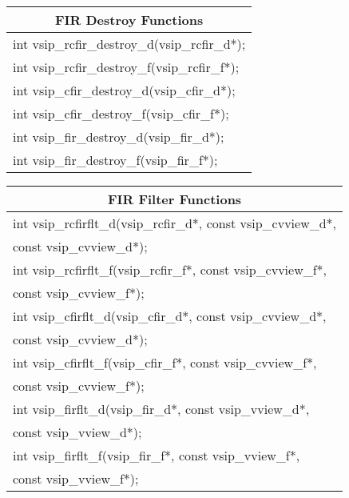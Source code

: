 \newline \hspace*{1.cm} {
\ttfamily
\begin{tabular}[H]{|l|}
\multicolumn{1}{c}{\rmfamily \bfseries FIR Destroy Functions\vspace{.1cm}}\\ \hline
int vsip\_rcfir\_destroy\_d(vsip\_rcfir\_d*);\\
int vsip\_rcfir\_destroy\_f(vsip\_rcfir\_f*);\\
int vsip\_cfir\_destroy\_d(vsip\_cfir\_d*);\\
int vsip\_cfir\_destroy\_f(vsip\_cfir\_f*);\\
int vsip\_fir\_destroy\_d(vsip\_fir\_d*);\\
int vsip\_fir\_destroy\_f(vsip\_fir\_f*);\\\hline
\end{tabular}\vspace{.1cm}
}\vspace{.1cm}
\newline \hspace*{1.cm} {
\ttfamily
\begin{tabular}[H]{|l|}
\multicolumn{1}{c}{\rmfamily \bfseries FIR Filter Functions\vspace{.1cm}}\\ \hline
int vsip\_rcfirflt\_d(vsip\_rcfir\_d*, const vsip\_cvview\_d*,\\*\hspace{.7cm}const vsip\_cvview\_d*);\\
int vsip\_rcfirflt\_f(vsip\_rcfir\_f*, const vsip\_cvview\_f*,\\*\hspace{.7cm}const vsip\_cvview\_f*);\\
int vsip\_cfirflt\_d(vsip\_cfir\_d*, const vsip\_cvview\_d*,\\*\hspace{.7cm}const vsip\_cvview\_d*);\\
int vsip\_cfirflt\_f(vsip\_cfir\_f*, const vsip\_cvview\_f*,\\*\hspace{.7cm}const vsip\_cvview\_f*);\\
int vsip\_firflt\_d(vsip\_fir\_d*, const vsip\_vview\_d*,\\*\hspace{.7cm}const vsip\_vview\_d*);\\
int vsip\_firflt\_f(vsip\_fir\_f*, const vsip\_vview\_f*,\\*\hspace{.7cm}const vsip\_vview\_f*);\\\hline
\end{tabular}\vspace{.1cm}
}
